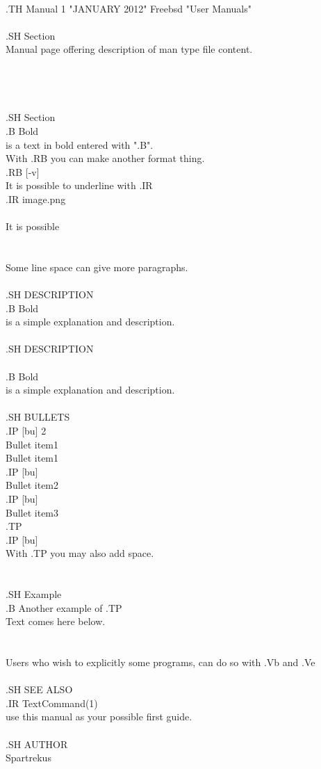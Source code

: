 \documentclass[11pt]{article}
\begin{document}
\\
 .TH Manual 1 "JANUARY 2012" Freebsd "User Manuals"\\
\\
 .SH Section \\
Manual page offering description of man type file content.\\
\\
\\
\\
\\
 .SH Section\\
 .B Bold\\
is a text in bold entered with ".B". \\
With .RB you can make another format thing.\\
 .RB [-v]\\
It is possible to underline with .IR\\
 .IR image.png \\
\\
It is possible\\
\\
\\
Some line space can give more paragraphs.\\
\\
 .SH DESCRIPTION\\
 .B Bold\\
is a simple explanation and description.  \\
\\
 .SH DESCRIPTION\\
\\
 .B Bold\\
is a simple explanation and description.  \\
\\
 .SH BULLETS\\
 .IP [bu] 2\\
Bullet item1 \\
Bullet item1 \\
 .IP [bu]\\
Bullet item2\\
 .IP [bu]\\
Bullet item3\\
 .TP\\
 .IP [bu]\\
With .TP you may also add space.\\
\\
\\
 .SH Example\\
 .B Another example of .TP\\
Text comes here below.\\
\\
\\
Users who wish to explicitly some programs, can do so with .Vb and .Ve \\
\\
 .SH SEE ALSO\\
 .IR TextCommand(1)\\
use this manual as your possible first guide.\\
\\
 .SH AUTHOR\\
Spartrekus\\
\end{document}
